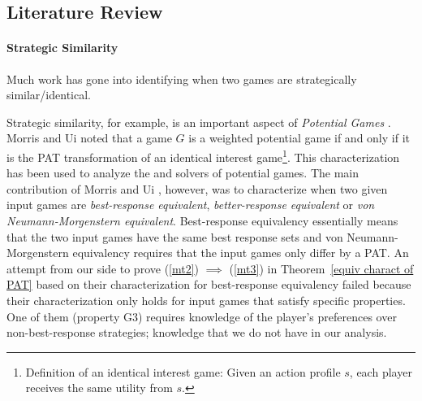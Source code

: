 \subsection{Literature Review}
\label{literature review}
\paragraph{Strategic Similarity}
Much work has gone into identifying when two games are strategically similar/identical.

Strategic similarity, for example, is an important aspect of \textit{Potential Games} \cite{MONDERER1996124}. Morris and Ui \cite{MORRIS2004260} noted that a game $G$ is a weighted potential game if and only if it is the PAT transformation of an identical interest game\footnote{Definition of an identical interest game: Given an action profile $s$, each player receives the same utility from $s$.}. This characterization has been used to analyze the \NEs{} and solvers of potential games. The main contribution of Morris and Ui \cite{MORRIS2004260}, however, was to characterize when two given input games are \textit{best-response equivalent}, \textit{better-response equivalent} or \textit{von Neumann-Morgenstern equivalent}. Best-response equivalency essentially means that the two input games have the same best response sets
and von Neumann-Morgenstern equivalency requires that the input games only differ by a PAT.
An attempt from our side to prove (\ref{mt2}) $\implies$ (\ref{mt3}) in Theorem~\ref{equiv charact of PAT} based on their characterization for best-response equivalency \cite[Prop. 4-5, Cor. 6]{MORRIS2004260} failed because their characterization only holds for input games that satisfy specific properties. One of them (property G3) requires knowledge of the player's preferences over non-best-response strategies; knowledge that we do not have in our analysis.


